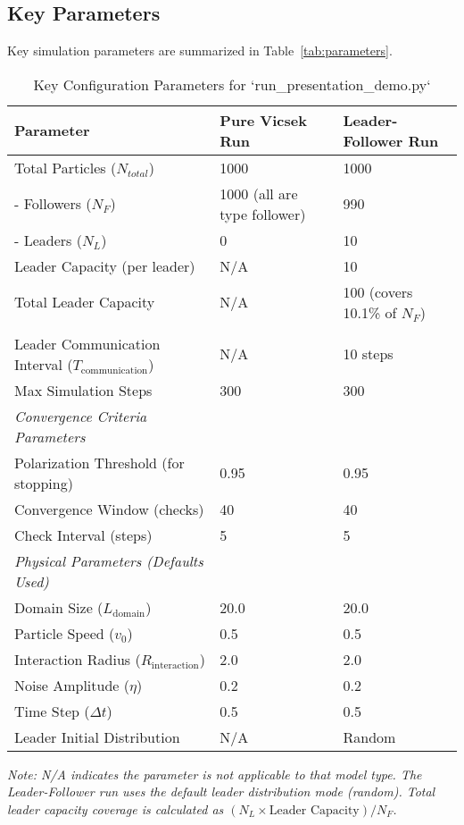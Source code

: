 \documentclass[11pt]{article}
\begin{document}
\subsection{Key Parameters}
Key simulation parameters are summarized in Table~\ref{tab:parameters}.

\begin{table}[H]
    \centering
    \caption{Key Configuration Parameters for `run_presentation_demo.py`}
    \label{tab:demo_params}
    \begin{tabular}{lll}
        \toprule 
        Parameter & Pure Vicsek Run & Leader-Follower Run \\ 
        \midrule
        Total Particles ($N_{total}$) & 1000 & 1000 \\ 
        \quad - Followers ($N_F$) & 1000 (all are type follower) & 990 \\ 
        \quad - Leaders ($N_L$) & 0 & 10 \\ 
        Leader Capacity (per leader) & N/A & 10 \\ 
        Total Leader Capacity & N/A & 100 (covers 10.1\% of $N_F$) \\\\ 
        Leader Communication Interval ($T_{\text{communication}}$) & N/A & 10 steps \\ 
        Max Simulation Steps & 300 & 300 \\ 
        \addlinespace %
        \textit{Convergence Criteria Parameters} & & \\ 
        Polarization Threshold (for stopping) & 0.95 & 0.95 \\ 
        Convergence Window (checks) & 40 & 40 \\ 
        Check Interval (steps) & 5 & 5 \\ 
        \addlinespace
        \textit{Physical Parameters (Defaults Used)} & & \\ 
        Domain Size ($L_{\text{domain}}$) & 20.0 & 20.0 \\ 
        Particle Speed ($v_0$) & 0.5 & 0.5 \\ 
        Interaction Radius ($R_{\text{interaction}}$) & 2.0 & 2.0 \\ 
        Noise Amplitude ($\eta$) & 0.2 & 0.2 \\ 
        Time Step ($\Delta t$) & 0.5 & 0.5 \\ 
        Leader Initial Distribution & N/A & Random \\ 
        \bottomrule
    \end{tabular}
    \parbox{\textwidth}{\footnotesize \textit{Note: N/A indicates the parameter is not applicable to that model type. The Leader-Follower run uses the default leader distribution mode (random). Total leader capacity coverage is calculated as $(N_L \times \text{Leader Capacity}) / N_F$.}}
\end{table}
\end{document}
